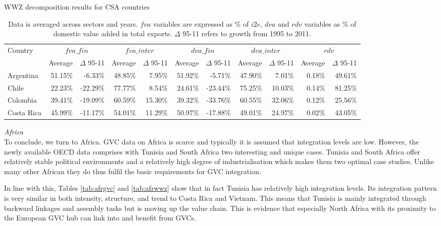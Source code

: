 \documentclass[11pt,a4paper]{article}
\begin{document}
\begin{table}[htbp]\small
  \centering
  \caption{WWZ decomposition results for CSA countries}
  \hspace*{-2.7cm}
    \begin{tabular}{lrrrrrrrrrr} 
    \toprule
    \multicolumn{1}{l}{\multirow{1}[0]{*}{Country}} & \multicolumn{2}{c}{$fva\_fin$} & \multicolumn{2}{c}{$fva\_inter$} & \multicolumn{2}{c}{$dva\_fin$} & \multicolumn{2}{c}{$dva\_inter$} & \multicolumn{2}{c}{$rdv$} \\
    \multicolumn{1}{l}{} & \multicolumn{1}{c}{Average} & \multicolumn{1}{c}{$\Delta$ 95-11} &
\multicolumn{1}{c}{Average} & \multicolumn{1}{c}{$\Delta$ 95-11} & \multicolumn{1}{c}{Average} & \multicolumn{1}{c}{$\Delta$ 95-11} & \multicolumn{1}{c}{Average} & \multicolumn{1}{c}{$\Delta$ 95-11} & \multicolumn{1}{c}{Average} & \multicolumn{1}{c}{$\Delta$ 95-11} \\
  \midrule
    Argentina & 51.15\% & -6.33\% & 48.85\% & 7.95\% & 51.92\% & -5.71\% & 47.90\% & 7.01\% & 0.18\% & 49.61\% \\
    Chile & 22.23\% & -22.29\% & 77.77\% & 8.54\% & 24.61\% & -23.44\% & 75.25\% & 10.03\% & 0.14\% & 81.25\% \\
    Colombia & 39.41\% & -19.09\% & 60.59\% & 15.30\% & 39.32\% & -33.76\% & 60.55\% & 32.06\% & 0.12\% & 25.56\% \\
    Costa Rica & 45.99\% & -11.17\% & 54.01\% & 11.29\% & 50.97\% & -17.88\% & 49.01\% & 24.97\% & 0.02\% & 43.05\% \\
   \bottomrule
    \end{tabular}
  \label{tab:csawwz}
     \caption*{Data is averaged across sectors and years. $fva$ variables are expressed as \% of $i2e$, $dva$ and $rdv$ variables as \% of domestic value added in total exports. $\Delta$ 95-11 refers to growth from 1995 to 2011.}
\end{table}

\textit{Africa}\\
To conclude, we turn to Africa. GVC data on Africa is scarce and typically it is assumed that integration levels are low. However, the newly available OECD data comprises with Tunisia and South Africa two interesting and unique cases. Tunisia and South Africa offer relatively stable political environments and a relatively high degree of industrialisation which makes them two optimal case studies. Unlike many other African they do thus fulfil the basic requirements for GVC integration.

In line with this, Tables \ref{tab:afrgvc} and \ref{tab:afrwwz} show that in fact Tunisia has relatively high integration levels. Its integration pattern is very similar in both intensity, structure, and trend to Costa Rica and Vietnam. This means that Tunisia is mainly integrated through backward linkages and assembly tasks but is moving up the value chain. This is evidence that especially North Africa with its proximity to the European GVC hub can link into and benefit from GVCs.
\end{document}
